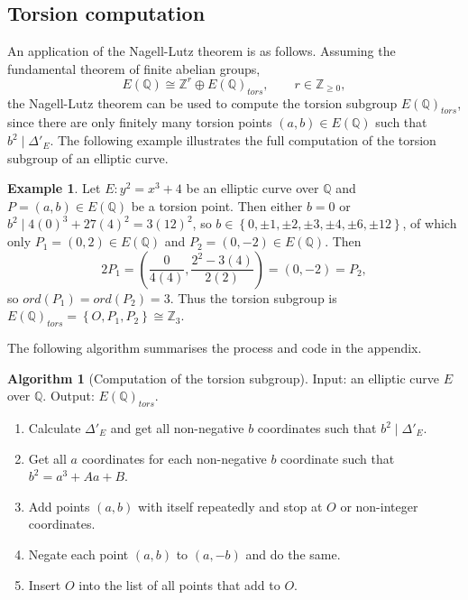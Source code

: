 \documentclass{article}
\newcommand{\Z}{\mathbb{Z}}
\newcommand{\Q}{\mathbb{Q}}
\newcommand{\rb}[1]{\left( #1 \right)}
\newcommand{\cb}[1]{\left\{ #1 \right\}}
\theoremstyle{definition}\newtheorem*{definition}{Definition}
\theoremstyle{definition}\newtheorem*{example}{Example}
\theoremstyle{definition}\newtheorem*{remark}{Remark}
\newtheorem{algorithm}[proposition]{Algorithm}
\begin{document}
\subsection{Torsion computation}

An application of the Nagell-Lutz theorem is as follows. Assuming the fundamental theorem of finite abelian groups,
$$ E\rb{\Q} \cong \Z^r \oplus E\rb{\Q}_{tors}, \qquad r \in \Z_{\ge 0}, $$
the Nagell-Lutz theorem can be used to compute the torsion subgroup $ E\rb{\Q}_{tors} $, since there are only finitely many torsion points $ \rb{a, b} \in E\rb{\Q} $ such that $ b^2 \mid \Delta'_E $. The following example illustrates the full computation of the torsion subgroup of an elliptic curve.

\begin{example}
Let $ E : y^2 = x^3 + 4 $ be an elliptic curve over $ \Q $ and $ P = \rb{a, b} \in E\rb{\Q} $ be a torsion point. Then either $ b = 0 $ or $ b^2 \mid 4\rb{0}^3 + 27\rb{4}^2 = 3\rb{12}^2 $, so $ b \in \cb{0, \pm 1, \pm 2, \pm 3, \pm 4, \pm 6, \pm 12} $, of which only $ P_1 = \rb{0, 2} \in E\rb{\Q} $ and $ P_2 = \rb{0, -2} \in E\rb{\Q} $. Then
$$ 2P_1 = \rb{\dfrac{0}{4\rb{4}}, \dfrac{2^2 - 3\rb{4}}{2\rb{2}}} = \rb{0, -2} = P_2, $$
so $ ord\rb{P_1} = ord\rb{P_2} = 3 $. Thus the torsion subgroup is $ E\rb{\Q}_{tors} = \cb{O, P_1, P_2} \cong \Z_3 $.
\end{example}

The following algorithm summarises the process and code in the appendix.

\begin{algorithm}[Computation of the torsion subgroup]
Input: an elliptic curve $ E $ over $ \Q $. Output: $ E\rb{\Q}_{tors} $.
\begin{enumerate}
\item Calculate $ \Delta'_E $ and get all non-negative $ b $ coordinates such that $ b^2 \mid \Delta'_E $.
\item Get all $ a $ coordinates for each non-negative $ b $ coordinate such that $ b^2 = a^3 + Aa + B $.
\item Add points $ \rb{a, b} $ with itself repeatedly and stop at $ O $ or non-integer coordinates.
\item Negate each point $ \rb{a, b} $ to $ \rb{a, -b} $ and do the same.
\item Insert $ O $ into the list of all points that add to $ O $.
\end{enumerate}
\end{algorithm}
\end{document}
